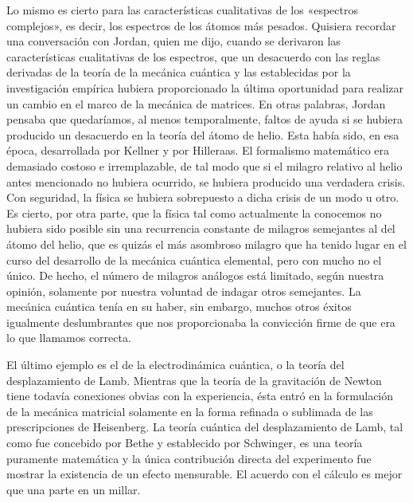 \documentclass[a4paper, 12pt]{article}
\begin{document}
Lo mismo es cierto para las características cualitativas de los «espectros complejos», es decir, los espectros de los átomos más pesados. Quisiera recordar una conversación con Jordan, quien me dijo, cuando se derivaron las características cualitativas de los espectros, que un desacuerdo con las reglas derivadas de la teoría de la mecánica cuántica y las establecidas por la investigación empírica hubiera proporcionado la última oportunidad para realizar un cambio en el marco de la mecánica de matrices. En otras palabras, Jordan pensaba que quedaríamos, al menos temporalmente, faltos de ayuda si se hubiera producido un desacuerdo en la teoría del átomo de helio. Esta había sido, en esa época, desarrollada por Kellner y por Hilleraas.  El formalismo matemático era demasiado costoso e irremplazable, de tal modo que  si el milagro relativo al helio antes mencionado no hubiera ocurrido, se hubiera producido una verdadera crisis. Con seguridad, la física se hubiera sobrepuesto a dicha crisis de un modo u otro. Es cierto, por otra parte, que la física tal como actualmente la conocemos no hubiera sido posible sin una recurrencia constante de milagros semejantes al del átomo del helio, que es quizás el más asombroso milagro que ha tenido lugar en el curso del desarrollo de la mecánica cuántica elemental, pero con mucho no el único. De hecho, el número de milagros análogos está limitado, según nuestra opinión, solamente por nuestra voluntad de indagar otros semejantes. La mecánica cuántica tenía en su haber, sin embargo, muchos otros éxitos igualmente deslumbrantes que nos proporcionaba la convicción firme de que era lo que llamamos correcta.

El último ejemplo es el de la electrodinámica cuántica, o la teoría del desplazamiento de Lamb. Mientras que la teoría de la gravitación de Newton tiene todavía conexiones obvias con la experiencia, ésta entró en la formulación de la mecánica matricial solamente en la forma refinada o sublimada de las prescripciones de Heisenberg. La teoría cuántica del desplazamiento de Lamb, tal como fue concebido por Bethe y establecido por Schwinger, es una teoría puramente matemática y la única contribución directa del experimento fue mostrar la existencia de un efecto mensurable. El acuerdo con el cálculo es mejor que una parte en un millar.
\end{document}

